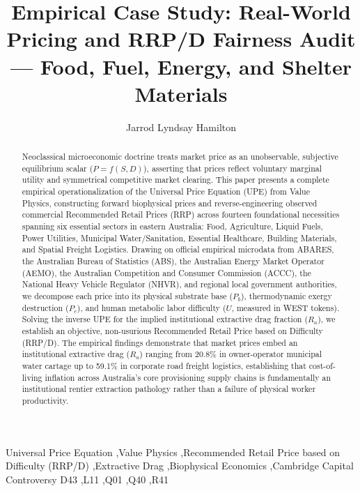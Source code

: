 \documentclass[preprint,12pt,authoryear]{elsarticle}
\begin{document}
\begin{frontmatter}

\title{Empirical Case Study: Real-World Pricing and RRP/D Fairness Audit --- Food, Fuel, Energy, and Shelter Materials}

\author{Jarrod Lyndsay Hamilton}
\address{Alethekanon Research Institute, Division 2: Societal Economics \& Macro-Micro Simulation, Australia}

\begin{abstract}
Neoclassical microeconomic doctrine treats market price as an unobservable, subjective equilibrium scalar ($P = f(S, D)$), asserting that prices reflect voluntary marginal utility and symmetrical competitive market clearing. This paper presents a complete empirical operationalization of the Universal Price Equation (UPE) from Value Physics, constructing forward biophysical prices and reverse-engineering observed commercial Recommended Retail Prices (RRP) across fourteen foundational necessities spanning six essential sectors in eastern Australia: Food, Agriculture, Liquid Fuels, Power Utilities, Municipal Water/Sanitation, Essential Healthcare, Building Materials, and Spatial Freight Logistics. Drawing on official empirical microdata from ABARES, the Australian Bureau of Statistics (ABS), the Australian Energy Market Operator (AEMO), the Australian Competition and Consumer Commission (ACCC), the National Heavy Vehicle Regulator (NHVR), and regional local government authorities, we decompose each price into its physical substrate base ($P_b$), thermodynamic exergy destruction ($P_e$), and human metabolic labor difficulty ($U$, measured in WEST tokens). Solving the inverse UPE for the implied institutional extractive drag fraction ($R_a$), we establish an objective, non-usurious Recommended Retail Price based on Difficulty (RRP/D). The empirical findings demonstrate that market prices embed an institutional extractive drag ($R_a$) ranging from 20.8\% in owner-operator municipal water cartage up to 59.1\% in corporate road freight logistics, establishing that cost-of-living inflation across Australia's core provisioning supply chains is fundamentally an institutional rentier extraction pathology rather than a failure of physical worker productivity.
\end{abstract}

\begin{keyword}
Universal Price Equation \sep Value Physics \sep Recommended Retail Price based on Difficulty (RRP/D) \sep Extractive Drag \sep Biophysical Economics \sep Cambridge Capital Controversy
\JEL D43 \sep L11 \sep Q01 \sep Q40 \sep R41
\end{keyword}

\end{frontmatter}
\end{document}
